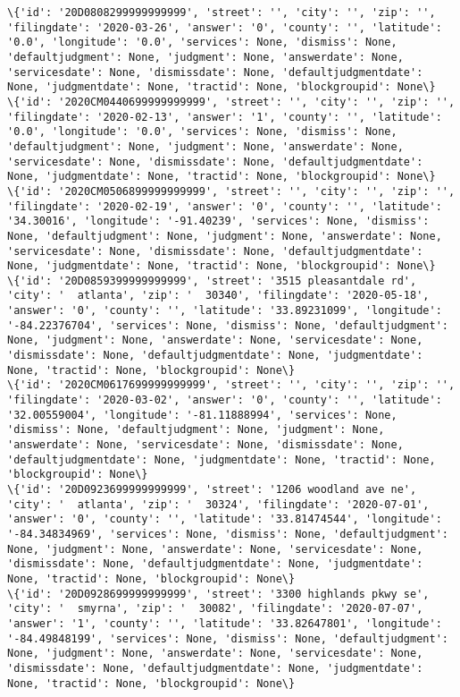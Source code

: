 \documentclass[11pt]{article}
\begin{document}
\begin{Verbatim}[commandchars=\\\{\}]
\{'id': '20D0808299999999999', 'street': '', 'city': '', 'zip': '', 'filingdate': '2020-03-26', 'answer': '0', 'county': '', 'latitude': '0.0', 'longitude': '0.0', 'services': None, 'dismiss': None, 'defaultjudgment': None, 'judgment': None, 'answerdate': None, 'servicesdate': None, 'dismissdate': None, 'defaultjudgmentdate': None, 'judgmentdate': None, 'tractid': None, 'blockgroupid': None\}
\{'id': '2020CM0440699999999999', 'street': '', 'city': '', 'zip': '', 'filingdate': '2020-02-13', 'answer': '1', 'county': '', 'latitude': '0.0', 'longitude': '0.0', 'services': None, 'dismiss': None, 'defaultjudgment': None, 'judgment': None, 'answerdate': None, 'servicesdate': None, 'dismissdate': None, 'defaultjudgmentdate': None, 'judgmentdate': None, 'tractid': None, 'blockgroupid': None\}
\{'id': '2020CM0506899999999999', 'street': '', 'city': '', 'zip': '', 'filingdate': '2020-02-19', 'answer': '0', 'county': '', 'latitude': '34.30016', 'longitude': '-91.40239', 'services': None, 'dismiss': None, 'defaultjudgment': None, 'judgment': None, 'answerdate': None, 'servicesdate': None, 'dismissdate': None, 'defaultjudgmentdate': None, 'judgmentdate': None, 'tractid': None, 'blockgroupid': None\}
\{'id': '20D0859399999999999', 'street': '3515 pleasantdale rd', 'city': '  atlanta', 'zip': '  30340', 'filingdate': '2020-05-18', 'answer': '0', 'county': '', 'latitude': '33.89231099', 'longitude': '-84.22376704', 'services': None, 'dismiss': None, 'defaultjudgment': None, 'judgment': None, 'answerdate': None, 'servicesdate': None, 'dismissdate': None, 'defaultjudgmentdate': None, 'judgmentdate': None, 'tractid': None, 'blockgroupid': None\}
\{'id': '2020CM0617699999999999', 'street': '', 'city': '', 'zip': '', 'filingdate': '2020-03-02', 'answer': '0', 'county': '', 'latitude': '32.00559004', 'longitude': '-81.11888994', 'services': None, 'dismiss': None, 'defaultjudgment': None, 'judgment': None, 'answerdate': None, 'servicesdate': None, 'dismissdate': None, 'defaultjudgmentdate': None, 'judgmentdate': None, 'tractid': None, 'blockgroupid': None\}
\{'id': '20D0923699999999999', 'street': '1206 woodland ave ne', 'city': '  atlanta', 'zip': '  30324', 'filingdate': '2020-07-01', 'answer': '0', 'county': '', 'latitude': '33.81474544', 'longitude': '-84.34834969', 'services': None, 'dismiss': None, 'defaultjudgment': None, 'judgment': None, 'answerdate': None, 'servicesdate': None, 'dismissdate': None, 'defaultjudgmentdate': None, 'judgmentdate': None, 'tractid': None, 'blockgroupid': None\}
\{'id': '20D0928699999999999', 'street': '3300 highlands pkwy se', 'city': '  smyrna', 'zip': '  30082', 'filingdate': '2020-07-07', 'answer': '1', 'county': '', 'latitude': '33.82647801', 'longitude': '-84.49848199', 'services': None, 'dismiss': None, 'defaultjudgment': None, 'judgment': None, 'answerdate': None, 'servicesdate': None, 'dismissdate': None, 'defaultjudgmentdate': None, 'judgmentdate': None, 'tractid': None, 'blockgroupid': None\}

\end{Verbatim}
\end{document}
